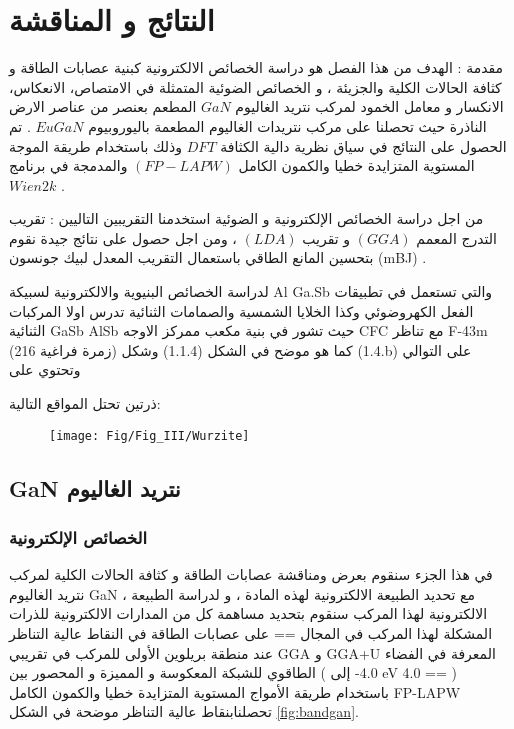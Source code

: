 \chapter{النتائج و المناقشة } %

\label{Chapter3} %

مقدمة :
الهدف من هذا الفصل هو دراسة الخصائص الالكترونية كبنية عصابات الطاقة و كثافة الحالات الكلية والجزيئة ، و الخصائص الضوئية المتمثلة في الامتصاص، الانعكاس، الانكسار و معامل الخمود لمركب نتريد الغاليوم $ GaN $ المطعم بعنصر  من عناصر الارض الناذرة   حيث تحصلنا على مركب نتريدات الغاليوم المطعمة باليوروبيوم $ EuGaN $ . تم الحصول على النتائج في سياق نظرية دالية الكثافة $ DFT $ وذلك باستخدام طريقة الموجة المستوية المتزايدة خطيا والكمون الكامل $ (FP-LAPW) $ والمدمجة في برنامج $ Wien2k $ .

من اجل دراسة الخصائص الإلكترونية و الضوئية استخدمنا التقريبين التاليين : تقريب التدرج المعمم $ (GGA) $ و تقريب $ (LDA) $ ، ومن اجل حصول على نتائج جيدة نقوم بتحسين المانع الطاقي باستعمال التقريب المعدل لبيك جونسون (mBJ)  .

لدراسة الخصائص البنيوية والالكترونية لسبيكة Al Ga.Sb والتي تستعمل في تطبيقات الفعل الكهروضوئي وكذا الخلايا الشمسية والصمامات الثنائية تدرس اولا المركبات الثنائية GaSb AlSb حيث تشور في بنية مكعب ممركز الاوجه CFC مع تناظر F-43m (زمرة فراغية 216) كما هو موضح في الشكل (1.1.4) وشكل (1.4.b) على التوالي وتحتوي على

ذرتين تحتل المواقع التالية:

\begin{figure}[h!]
	\centering
	\texttt{[image: Fig/Fig\_III/Wurzite]}
	\caption{}
	\label{fig:wurzite}
\end{figure}


\section{GaN نتريد الغاليوم }
\subsection{الخصائص الإلكترونية }

في هذا الجزء سنقوم بعرض ومناقشة عصابات الطاقة و كثافة الحالات الكلية لمركب نتريد الغاليوم GaN ، مع تحديد الطبيعة الالكترونية لهذه المادة ، و لدراسة الطبيعة الالكترونية لهذا المركب سنقوم بتحديد مساهمة كل من المدارات الالكترونية للذرات المشكلة لهذا المركب في المجال == على عصابات الطاقة في النقاط عالية التناظر عند منطقة بريلوين الأولى للمركب في تقريبي GGA و GGA+U المعرفة في الفضاء الطاقوي للشبكة المعكوسة و المميزة و المحصور بين ( 4.0- إلى eV 4.0 == ) 
باستخدام طريقة الأمواج المستوية المتزايدة خطيا والكمون الكامل FP-LAPW تحصلنابنقاط عالية التناظر موضحة في الشكل \ref{fig:bandgan}.

